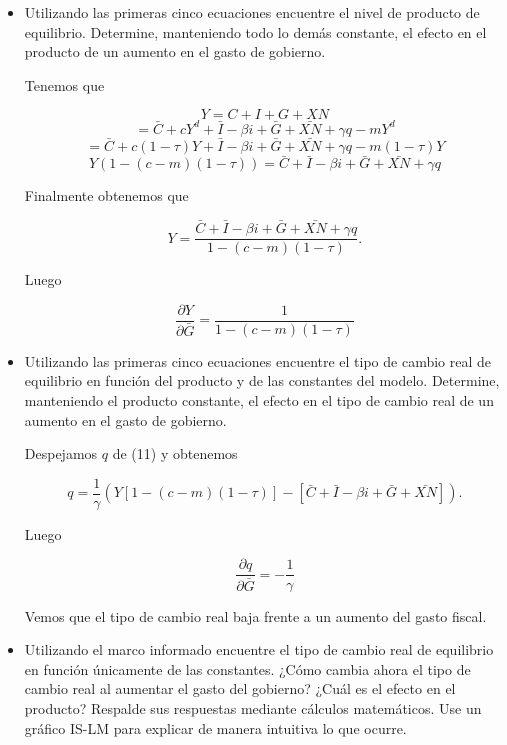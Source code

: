 \documentclass[a4paper]{article}
\begin{document}
\begin{itemize}

    \item[c)] Utilizando las primeras cinco ecuaciones encuentre el nivel de producto de equilibrio. Determine, manteniendo todo lo demás constante, el efecto en el producto de un aumento en el gasto de gobierno.

    \begin{solution}
Tenemos que

\[
Y = C + I + G + XN
\]
\[
= \bar{C} + cY^d + \bar{I} - \beta i + \bar{G} + \bar{XN} + \gamma q - mY^d
\]
\[
= \bar{C} + c(1 - \tau)Y + \bar{I} - \beta i + \bar{G} + \bar{XN} + \gamma q - m(1 - \tau)Y
\]
\[
Y \left(1 - (c - m)(1 - \tau) \right) = \bar{C} + \bar{I} - \beta i + \bar{G} + \bar{XN} + \gamma q
\]

Finalmente obtenemos que

\[
Y = \frac{\bar{C} + \bar{I} - \beta i + \bar{G} + \bar{XN} + \gamma q}{1 - (c - m)(1 - \tau)}. \tag{11}
\]

Luego

\[
\frac{\partial Y}{\partial \bar{G}} = \frac{1}{1 - (c - m)(1 - \tau)}
\]

\end{solution}


    \item[d)] Utilizando las primeras cinco ecuaciones encuentre el tipo de cambio real de equilibrio en función del producto y de las constantes del modelo. Determine, manteniendo el producto constante, el efecto en el tipo de cambio real de un aumento en el gasto de gobierno.

    \begin{solution}
Despejamos $q$ de (11) y obtenemos

\[
q = \frac{1}{\gamma} \left( Y[1 - (c - m)(1 - \tau)] - [\bar{C} + \bar{I} - \beta i + \bar{G} + \bar{XN}] \right).
\]

Luego

\[
\frac{\partial q}{\partial \bar{G}} = -\frac{1}{\gamma}
\]

Vemos que el tipo de cambio real baja frente a un aumento del gasto fiscal.

\end{solution}


    \item[e)] Utilizando el marco informado encuentre el tipo de cambio real de equilibrio en función únicamente de las constantes. ¿Cómo cambia ahora el tipo de cambio real al aumentar el gasto del gobierno? ¿Cuál es el efecto en el producto? Respalde sus respuestas mediante cálculos matemáticos. Use un gráfico IS-LM para explicar de manera intuitiva lo que ocurre.


\end{itemize}
\end{document}
